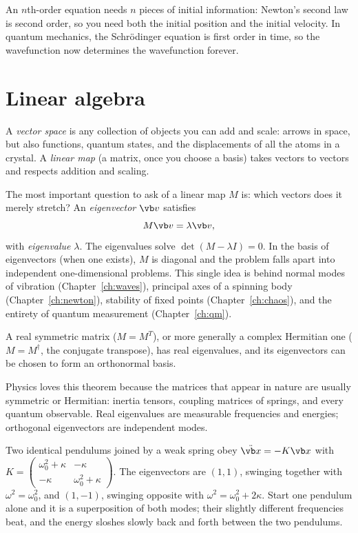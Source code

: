 \begin{remark}
An $n$th-order equation needs $n$ pieces of initial information: Newton's second law is second order, so you need both the initial position and the initial velocity. In quantum mechanics, the Schrödinger equation is first order in time, so the wavefunction now determines the wavefunction forever.
\end{remark}

\section{Linear algebra}

A \emph{vector space} is any collection of objects you can add and scale: arrows in space, but also functions, quantum states, and the displacements of all the atoms in a crystal. A \emph{linear map} (a matrix, once you choose a basis) takes vectors to vectors and respects addition and scaling.

The most important question to ask of a linear map $M$ is: which vectors does it merely stretch? An \emph{eigenvector} $\vb v$ satisfies
\[
  M\vb v = \lambda\vb v,
\]
with \emph{eigenvalue} $\lambda$. The eigenvalues solve $\det(M - \lambda I) = 0$. In the basis of eigenvectors (when one exists), $M$ is diagonal and the problem falls apart into independent one-dimensional problems. This single idea is behind normal modes of vibration (Chapter~\ref{ch:waves}), principal axes of a spinning body (Chapter~\ref{ch:newton}), stability of fixed points (Chapter~\ref{ch:chaos}), and the entirety of quantum measurement (Chapter~\ref{ch:qm}).

\begin{theorem}
A real symmetric matrix ($M = M^{T}$), or more generally a complex Hermitian one ($M = M^\dagger$, the conjugate transpose), has real eigenvalues, and its eigenvectors can be chosen to form an orthonormal basis.
\end{theorem}
Physics loves this theorem because the matrices that appear in nature are usually symmetric or Hermitian: inertia tensors, coupling matrices of springs, and every quantum observable. Real eigenvalues are measurable frequencies and energies; orthogonal eigenvectors are independent modes.

\begin{example}
Two identical pendulums joined by a weak spring obey $\ddot{\vb x} = -K\vb x$ with
$K = \begin{pmatrix} \omega_0^2 + \kappa & -\kappa\\ -\kappa & \omega_0^2+\kappa\end{pmatrix}$.
The eigenvectors are $(1,1)$, swinging together with $\omega^2 = \omega_0^2$, and $(1,-1)$, swinging opposite with $\omega^2 = \omega_0^2+2\kappa$. Start one pendulum alone and it is a superposition of both modes; their slightly different frequencies beat, and the energy sloshes slowly back and forth between the two pendulums.
\end{example}

